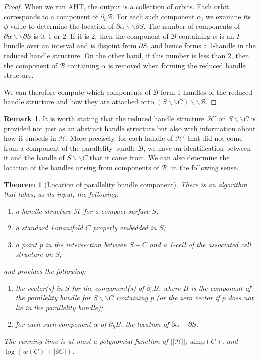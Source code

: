 \documentclass[oneside]{amsart}
\numberwithin{equation}{section}
\theoremstyle{plain}
\newtheorem{theorem}[equation]{Theorem}
\theoremstyle{definition}
\newtheorem{remark}[equation]{Remark}
\newcommand{\cut}{\backslash\backslash}
\newcommand{\calH}{\mathcal{H}}
\newcommand{\calB}{\mathcal{B}}
\begin{document}
\begin{proof}
When we run {\sc AHT}, the output is a collection of orbits. Each orbit corresponds to a component of $\partial_h \calB$. For each such component $\alpha$, we examine its $\phi$-value to determine the location of $\partial \alpha \cut \partial S$. The number of components of $\partial \alpha \cut \partial S$ is $0$, $1$ or $2$. If it is $2$, then the component of $\calB$ containing $\alpha$ is an $I$-bundle over an interval and is disjoint from $\partial S$, and hence forms a 1-handle in the reduced handle structure. On the other hand, if this number is less than $2$, then the component of $\calB$ containing $\alpha$ is removed when forming the reduced handle structure.

We can therefore compute which components of $\calB$ form 1-handles of the reduced handle structure and how they are attached onto $(S \cut C) \cut \calB$.
\end{proof}



\begin{remark} 
\label{Rem:ReducedHSEmbeds}
It is worth stating that the reduced handle structure $\calH'$ on $S \cut C$ is provided not just as an abstract handle structure but also with information about how it embeds in $\calH$. More precisely, for each handle of $\calH'$ that did not come from a component of the parallelity bundle $\calB$, we have an identification between it and the handle of $S \cut C$ that it came from. We can also determine the location of the handles arising from components of $\calB$, in the following sense.
\end{remark}

\begin{theorem}[{\sc Location of parallelity bundle component}]
\label{Thm:LocationParBundle}
There is an algorithm that takes, as its input, the following:
\begin{enumerate}
\item a handle structure $\calH$ for a compact surface $S$;
\item a standard 1-manifold $C$ properly embedded in $S$;
\item a point $p$ in the intersection between $S - C$ and a 1-cell of the associated cell structure on $S$;
\end{enumerate} and provides the following:
\begin{enumerate}
\item the vector(s) in $S$ for the component(s) of $\partial_hB$, where $B$ is the component of the parallelity bundle for $S \cut C$ containing $p$ (or  the zero vector if $p$ does not lie in the parallelity bundle);
\item for each such component $\alpha$ of $\partial_h B$, the location of $\partial \alpha - \partial S$.
\end{enumerate}
The running time is at most a polynomial function of $||\calH||$, $\mathrm{simp}(C)$, and $\log (w(C) + |\partial C|)$.
\end{theorem}
\end{document}
